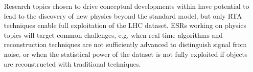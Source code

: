 
\noindent {\color{blue}{2. The \acronym program of searches and measurement could lead to breakthroughs in our understanding of nature}}
Research topics chosen to drive conceptual developments within \acronym have potential to lead to the discovery of new physics beyond the standard model, but only RTA techniques enable full exploitation of the LHC dataset. 
ESRs working on physics topics will target common challenges, e.g. when real-time algorithms and reconstruction techniques are not sufficiently advanced to distinguish signal from noise, or when the statistical power of the dataset is not fully exploited if objects are reconstructed with traditional techniques. 

